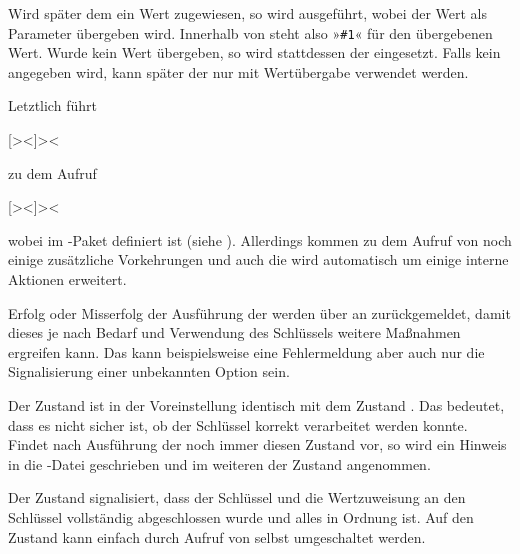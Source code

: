 Wird später dem  ein Wert zugewiesen, so wird 
ausgeführt, wobei der Wert als Parameter übergeben wird. Innerhalb von
 steht also »\lstinline{#1}« für den übergebenen Wert. Wurde
kein Wert übergeben, so wird stattdessen der 
eingesetzt. Falls kein  angegeben wird, kann später der
 nur mit Wertübergabe verwendet werden.

  \label{explain:scrbase.macro.DefineFamilyKey}%
  Letztlich führt
\begin{lstcode}[escapeinside=><]
                  [><]{><}
\end{lstcode}
  zu dem Aufruf
\begin{lstcode}[moretexcs={define@key},escapeinside=><]
             [><]{><}
\end{lstcode}
  wobei  im -Paket
  definiert ist (siehe \cite{package:keyval}). Allerdings kommen zu dem Aufruf
  von  noch einige zusätzliche Vorkehrungen und auch die
   wird automatisch um einige interne Aktionen erweitert.

Erfolg oder Misserfolg der Ausführung
der  werden über  an 
zurückgemeldet, damit dieses je nach Bedarf und Verwendung des Schlüssels
weitere Maßnahmen ergreifen kann. Das kann beispielsweise eine Fehlermeldung
aber auch nur die Signalisierung einer unbekannten Option sein.

Der Zustand  ist in der
Voreinstellung identisch mit dem Zustand . Das
bedeutet, dass es nicht sicher ist, ob der Schlüssel korrekt verarbeitet
werden konnte. Findet  nach Ausführung der 
noch immer diesen Zustand vor, so wird ein Hinweis in die -Datei
geschrieben und im weiteren der Zustand 
angenommen.

Der Zustand  signalisiert,
dass der Schlüssel und die Wertzuweisung an den Schlüssel vollständig
abgeschlossen wurde und alles in Ordnung ist. Auf den Zustand kann einfach
durch Aufruf von  selbst umgeschaltet werden.

